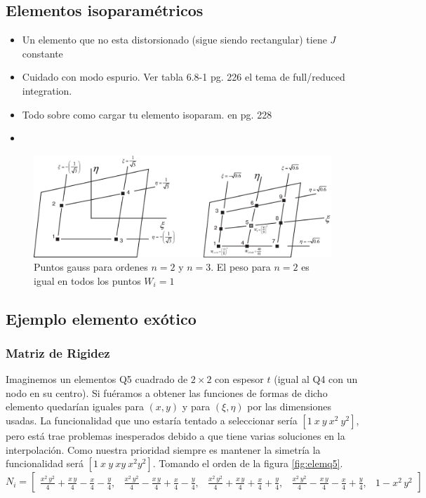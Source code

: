 \documentclass[draft,11pt, a4paper,titlepage]{article}
\begin{document}
\subsection{Elementos isoparamétricos}
\begin{itemize}
    \item Un elemento que no esta distorsionado (sigue siendo rectangular) tiene $J$ constante
    \item Cuidado con modo espurio. Ver tabla 6.8-1 pg. 226 el tema de full/reduced integration.
    \item Todo sobre como cargar tu elemento isoparam. en pg. 228
    \item 
\end{itemize}

\begin{figure}[htb!]
    \centering
    \includegraphics[width=12cm]{fig/gauss_n3.eps}
    \caption{Puntos gauss para ordenes $n=2$ y $n=3$. El peso para $n=2$ es igual en todos los puntos $W_i=1$}
    \label{fig:gauss_n3}
\end{figure}
\subsection{Ejemplo elemento exótico}
\subsubsection*{Matriz de Rigidez}
Imaginemos un elementos Q5 cuadrado de $2\times2$ con espesor $t$  (igual al Q4 con un nodo en su centro). Si fuéramos a obtener las funciones de formas de dicho elemento quedarían iguales para $(x,y)$ y para $(\xi,\eta)$ por las dimensiones usadas. La funcionalidad que uno estaría tentado a seleccionar sería $[1\ x \ y\ x^2 \ y^2 ]$, pero está trae problemas inesperados debido a que tiene varias soluciones en la interpolación. Como nuestra prioridad siempre es mantener la simetría la funcionalidad será $[1\ x\ y\ xy\ x^2y^2 ]$.  Tomando el orden de la figura \ref{fig:elemq5}.
\[
N_i=\left[\begin{array}{ccccc} \frac{x^2\,y^2}{4}+\frac{x\,y}{4}-\frac{x}{4}-\frac{y}{4}, & \frac{x^2\,y^2}{4}-\frac{x\,y}{4}+\frac{x}{4}-\frac{y}{4}, & \frac{x^2\,y^2}{4}+\frac{x\,y}{4}+\frac{x}{4}+\frac{y}{4}, & \frac{x^2\,y^2}{4}-\frac{x\,y}{4}-\frac{x}{4}+\frac{y}{4}, & 1-x^2\,y^2 \end{array}\right]
\]
\end{document}

